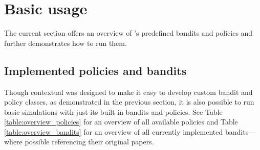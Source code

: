 \documentclass{jss}
\begin{document}
\section{Basic usage} \label{basicusage}

The current section offers an overview of 's predefined bandits and policies and further demonstrates how to run them.

\subsection{Implemented policies and bandits} \label{implbp}

Though contextual was designed to make it easy to develop custom bandit and policy classes, as demonstrated in the previous section, it is also possible to run basic simulations with just its built-in bandits and policies. See Table \ref{table:overview_policies} for an overview of all available policies and Table \ref{table:overview_bandits} for an overview of all currently implemented bandits---where possible referencing their original papers.
\end{document}
